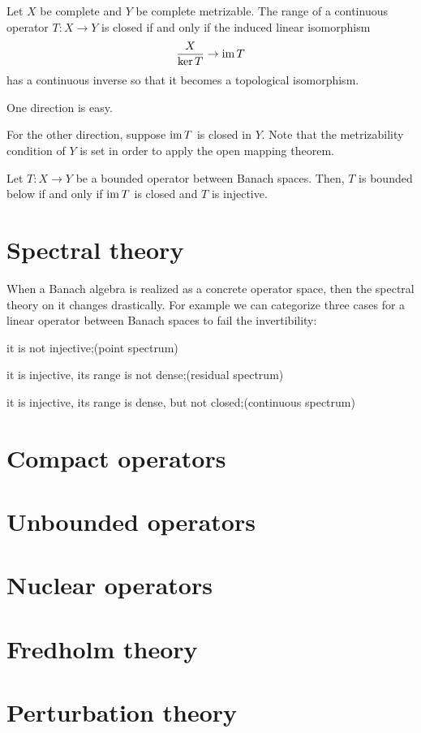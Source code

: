 \documentclass{../crs}
\begin{document}
\begin{thm}
Let $X$ be complete and $Y$ be complete metrizable.
The range of a continuous operator $T:X\to Y$ is closed if and only if the induced linear isomorphism
\[\frac X{\ker T}\to\im T\]
has a continuous inverse so that it becomes a topological isomorphism.
\end{thm}
\begin{pf}
One direction is easy.

For the other direction, suppose $\operatorname{im} T$ is closed in $Y$.
Note that the metrizability condition of $Y$ is set in order to apply the open mapping theorem.
\end{pf}
\begin{cor}
Let $T:X\to Y$ be a bounded operator between Banach spaces.
Then, $T$ is bounded below if and only if $\operatorname{im} T$ is closed and $T$ is injective.
\end{cor}



\section{Spectral theory}
When a Banach algebra is realized as a concrete operator space, then the spectral theory on it changes drastically.
For example we can categorize three cases for a linear operator between Banach spaces to fail the invertibility:
\begin{cond}
\item it is not injective;\hfill (point spectrum)
\item it is injective, its range is not dense;\hfill (residual spectrum)
\item it is injective, its range is dense, but not closed;\hfill (continuous spectrum)
\end{cond}



\section{Compact operators}

\section{Unbounded operators}

\section{Nuclear operators}

\section{Fredholm theory}

\section{Perturbation theory}
\end{document}
